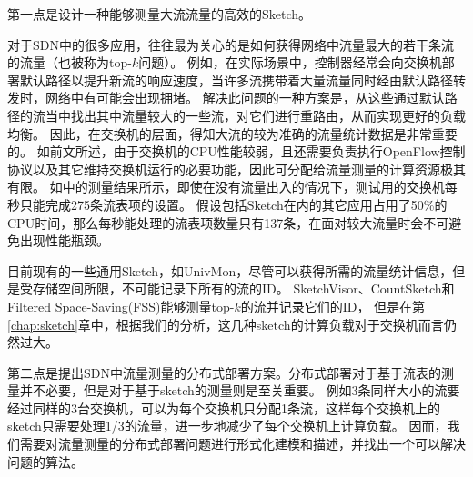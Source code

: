 第一点是设计一种能够测量大流流量的高效的Sketch。

对于SDN中的很多应用，往往最为关心的是如何获得网络中流量最大的若干条流的流量（也被称为top-$k$问题）。
例如，在实际场景中，控制器经常会向交换机部署默认路径以提升新流的响应速度，当许多流携带着大量流量同时经由默认路径转发时，网络中有可能会出现拥堵。
解决此问题的一种方案是，从这些通过默认路径的流当中找出其中流量较大的一些流，对它们进行重路由，从而实现更好的负载均衡。
因此，在交换机的层面，得知大流的较为准确的流量统计数据是非常重要的。
如前文所述，由于交换机的CPU性能较弱，且还需要负责执行OpenFlow控制协议以及其它维持交换机运行的必要功能，因此可分配给流量测量的计算资源极其有限。
如\cite{curtis2011devoflow}中的测量结果所示，即使在没有流量出入的情况下，测试用的交换机每秒只能完成275条流表项的设置。
假设包括Sketch在内的其它应用占用了50\%的CPU时间，那么每秒能处理的流表项数量只有137条，在面对较大流量时会不可避免出现性能瓶颈。

目前现有的一些通用Sketch，如UnivMon\cite{liu2016one}，尽管可以获得所需的流量统计信息，但是受存储空间所限，不可能记录下所有的流的ID。
SketchVisor\cite{huang2017sketchvisor}、CountSketch\cite{charikar2004finding}和Filtered Space-Saving(FSS)\cite{homem2010finding}能够测量top-$k$的流并记录它们的ID，
但是在第\ref{chap:sketch}章中，根据我们的分析，这几种sketch的计算负载对于交换机而言仍然过大。


第二点是提出SDN中流量测量的分布式部署方案。分布式部署对于基于流表的测量并不必要，但是对于基于sketch的测量则是至关重要。
例如3条同样大小的流要经过同样的3台交换机，可以为每个交换机只分配1条流，这样每个交换机上的sketch只需要处理1/3的流量，进一步地减少了每个交换机上计算负载。
因而，我们需要对流量测量的分布式部署问题进行形式化建模和描述，并找出一个可以解决问题的算法。

